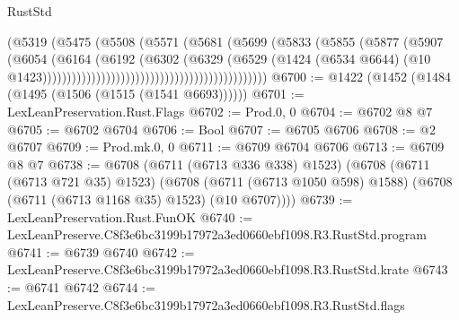 \begin{lexlean}{RustStd}
\begin{coremodule}
                                                            (@5319
                                                              (@5475
                                                                (@5508
                                                                  (@5571
                                                                    (@5681
                                                                      (@5699
                                                                        (@5833
                                                                          (@5855
                                                                            (@5877
                                                                              (@5907
                                                                                (@6054
                                                                                  (@6164
                                                                                    (@6192
                                                                                      (@6302
                                                                                        (@6329
                                                                                          (@6529
                                                                                            (@1424
                                                                                              (@6534
                                                                                                @6644)
                                                                                              (@10
                                                                                                @1423))))))))))))))))))))))))))))))))))))))))))))))
@6700 := @1422 (@1452 (@1484 (@1495 (@1506 (@1515 (@1541 @6693))))))
@6701 := LexLeanPreservation.Rust.Flags
@6702 := Prod.{0, 0}
@6704 := @6702 @8 @7
@6705 := @6702 @6704
@6706 := Bool
@6707 := @6705 @6706
@6708 := @2 @6707
@6709 := Prod.mk.{0, 0}
@6711 := @6709 @6704 @6706
@6713 := @6709 @8 @7
@6738 := @6708
    (@6711 (@6713 @336 @338) @1523)
    (@6708
      (@6711 (@6713 @721 @35) @1523)
      (@6708 (@6711 (@6713 @1050 @598) @1588) (@6708 (@6711 (@6713 @1168 @35) @1523) (@10 @6707))))
@6739 := LexLeanPreservation.Rust.FunOK
@6740 := LexLeanPreserve.C8f3e6bc3199b17972a3ed0660ebf1098.R3.RustStd.program
@6741 := @6739 @6740
@6742 := LexLeanPreserve.C8f3e6bc3199b17972a3ed0660ebf1098.R3.RustStd.krate
@6743 := @6741 @6742
@6744 := LexLeanPreserve.C8f3e6bc3199b17972a3ed0660ebf1098.R3.RustStd.flags

\end{coremodule}
\end{lexlean}
